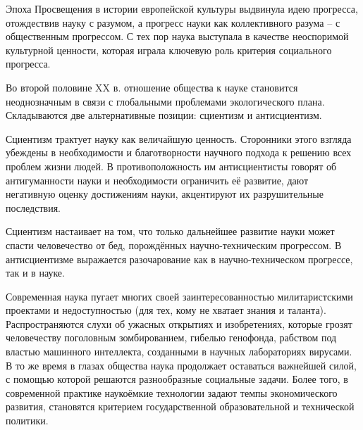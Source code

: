 \documentclass[exam_answers.tex]{subfiles}
\begin{document}
\renewcommand{\baselinestretch}{\blch}

Эпоха Просвещения в истории европейской культуры выдвинула идею прогресса, отождествив науку с разумом, а прогресс науки как коллективного разума – с общественным прогрессом.
С тех пор наука выступала в качестве неоспоримой культурной ценности, которая играла ключевую роль критерия социального прогресса.

Во второй половине XX в. отношение общества к науке становится неоднозначным в связи с глобальными проблемами экологического плана.
Складываются две альтернативные позиции: сциентизм и антисциентизм.

Сциентизм трактует науку как величайшую ценность.
Сторонники этого взгляда убеждены в необходимости и благотворности научного подхода к решению всех проблем жизни людей.
В противоположность им антисциентисты говорят об антигуманности науки и необходимости ограничить её развитие, дают негативную оценку достижениям науки, акцентируют их разрушительные последствия.

Сциентизм настаивает на том, что только дальнейшее развитие науки может спасти человечество от бед, порождённых научно-техническим прогрессом.
В антисциентизме выражается разочарование как в научно-техническом прогрессе, так и в науке.

Современная наука пугает многих своей заинтересованностью милитаристскими проектами и недоступностью (для тех, кому не хватает знания и таланта).
Распространяются слухи об ужасных открытиях и изобретениях, которые грозят человечеству поголовным зомбированием, гибелью генофонда, рабством под властью машинного интеллекта, созданными в научных лабораториях вирусами.
В то же время в глазах общества наука продолжает оставаться важнейшей силой, с помощью которой решаются разнообразные социальные задачи.
Более того, в современной практике наукоёмкие технологии задают темпы экономического развития, становятся критерием государственной образовательной и технической политики.
\end{document}
